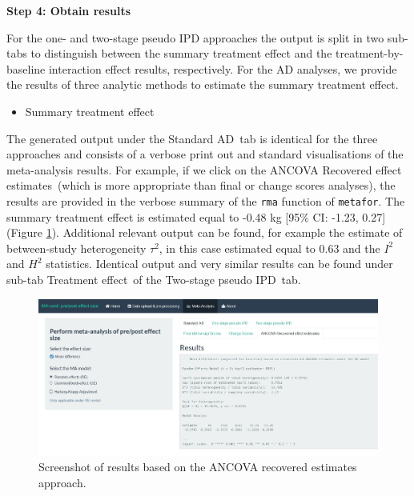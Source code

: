\documentclass[AMA,STIX1COL]{WileyNJD-v2}
\begin{document}
\vspace{0.1cm}

\textbf{Step 4: Obtain results}
\vspace{0.1cm}

For the one- and two-stage pseudo IPD approaches the output is split in two sub-tabs to distinguish between the summary treatment effect and the treatment-by-baseline interaction effect results, respectively. For the AD analyses, we provide the results of three analytic methods to estimate the summary treatment effect.

\begin{itemize}
\item Summary treatment effect
\end{itemize}
The generated output under the \textquotesingle Standard AD\textquotesingle\ tab is identical for the three approaches and consists of a verbose print out and standard visualisations of the meta-analysis results. For example, if we click on the \textquotesingle ANCOVA Recovered effect estimates\textquotesingle\ (which is more appropriate than final or change scores analyses), the results are provided in the verbose summary of the \texttt{rma} function of \texttt{metafor}. The summary treatment effect is estimated equal to -0.48 kg [95\% CI: -1.23, 0.27] (Figure \ref{fig:shiny-ancova_res}). Additional relevant output can be found, for example the estimate of between-study heterogeneity $\tau^2$, in this case estimated equal to 0.63 and the $I^2$ and $H^2$ statistics. Identical output and very similar results can be found under sub-tab \textquotesingle Treatment effect\textquotesingle\ of the \textquotesingle Two-stage pseudo IPD\textquotesingle\ tab.

\begin{figure}[t]
  \centering \includegraphics[width=1.0\textwidth]{ANCOVA_res.JPG}
    \caption{\small {Screenshot of results based on the ANCOVA recovered estimates approach.}} \label{fig:shiny-ancova_res}
\end{figure}
\end{document}
